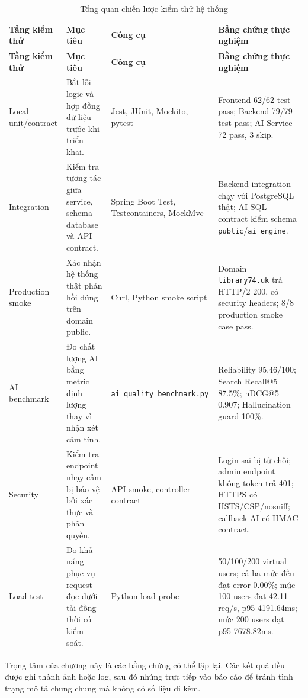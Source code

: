 \small
\renewcommand{\arraystretch}{1.35}
\begin{longtable}{|p{2.9cm}|p{3.6cm}|p{2.8cm}|p{5.0cm}|}
\caption{Tổng quan chiến lược kiểm thử hệ thống}
\label{tab:testing_strategy_overview} \\
\hline
\textbf{Tầng kiểm thử} & \textbf{Mục tiêu} & \textbf{Công cụ} & \textbf{Bằng chứng thực nghiệm} \\
\hline
\endfirsthead

\hline
\textbf{Tầng kiểm thử} & \textbf{Mục tiêu} & \textbf{Công cụ} & \textbf{Bằng chứng thực nghiệm} \\
\hline
\endhead

Local unit/contract &
Bắt lỗi logic và hợp đồng dữ liệu trước khi triển khai. &
Jest, JUnit, Mockito, pytest &
Frontend 62/62 test pass; Backend 79/79 test pass; AI Service 72 pass, 3 skip. \\
\hline
Integration &
Kiểm tra tương tác giữa service, schema database và API contract. &
Spring Boot Test, Testcontainers, MockMvc &
Backend integration chạy với PostgreSQL thật; AI SQL contract kiểm schema \texttt{public}/\texttt{ai\_engine}. \\
\hline
Production smoke &
Xác nhận hệ thống thật phản hồi đúng trên domain public. &
Curl, Python smoke script &
Domain \texttt{library74.uk} trả HTTP/2 200, có security headers; 8/8 production smoke case pass. \\
\hline
AI benchmark &
Đo chất lượng AI bằng metric định lượng thay vì nhận xét cảm tính. &
\texttt{ai\_quality\_}\allowbreak \texttt{benchmark.py} &
Reliability 95.46/100; Search Recall@5 87.5\%; nDCG@5 0.907; Hallucination guard 100\%. \\
\hline
Security &
Kiểm tra endpoint nhạy cảm bị bảo vệ bởi xác thực và phân quyền. &
API smoke, controller contract &
Login sai bị từ chối; admin endpoint không token trả 401; HTTPS có HSTS/CSP/nosniff; callback AI có HMAC contract. \\
\hline
Load test &
Đo khả năng phục vụ request đọc dưới tải đồng thời có kiểm soát. &
Python load probe &
50/100/200 virtual users; cả ba mức đều đạt error 0.00\%; mức 100 users đạt 42.11 req/s, p95 4191.64ms; mức 200 users đạt p95 7678.82ms. \\
\hline
\end{longtable}

Trọng tâm của chương này là các bằng chứng có thể lặp lại. Các kết quả đều được
ghi thành ảnh hoặc log, sau đó nhúng trực tiếp vào báo cáo để tránh tình trạng
mô tả chung chung mà không có số liệu đi kèm.

